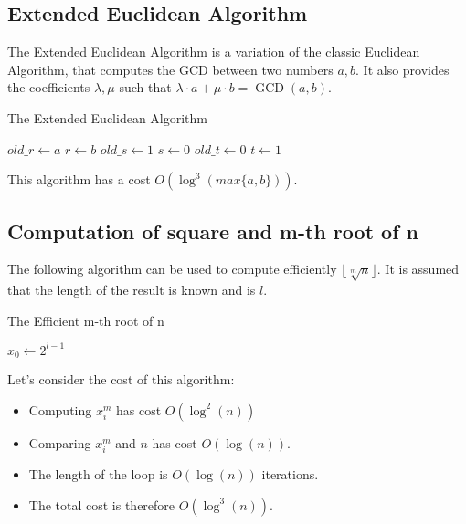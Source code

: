 \subsection{Extended Euclidean Algorithm}
The Extended Euclidean Algorithm is a variation of the classic Euclidean Algorithm, that computes the GCD between two numbers $a, b$. \newline
It also provides the coefficients $\lambda, \mu$ such that $\lambda \cdot a + \mu \cdot b = \operatorname{GCD}(a,b)$.\newline
{}
\begin{algorithm}
\caption{The Extended Euclidean Algorithm}\label{alg:ExtEucAlg}
$old\_r \gets a$\;
$r \gets b$\;
$old\_s \gets 1$\;
$s \gets 0$\;
$old\_t \gets 0$\;
$t \gets 1$\;
\end{algorithm}
This algorithm has a cost $O(\operatorname{log}^{3}(max\{a, b \}))$.

\subsection{Computation of square and m-th root of n}
The following algorithm can be used to compute efficiently $\lfloor \sqrt[m]{n} \rfloor$.\newline
It is assumed that the length of the result is known and is $l$.\newline
{}
\begin{algorithm}
\caption{The Efficient m-th root of n}\label{alg:m_root}
$x_{0} \gets 2^{l - 1}$\;
\end{algorithm}
Let's consider the cost of this algorithm:
\begin{itemize}
    \item Computing $x_{i}^{m}$ has cost $O(\operatorname{log}^{2}(n))$
    \item Comparing $x_{i}^{m}$ and $n$ has cost $O(\operatorname{log}(n))$.
    \item The length of the loop is $O(\operatorname{log}(n))$ iterations.
    \item The total cost is therefore $O(\operatorname{log}^{3}(n))$.
\end{itemize}

